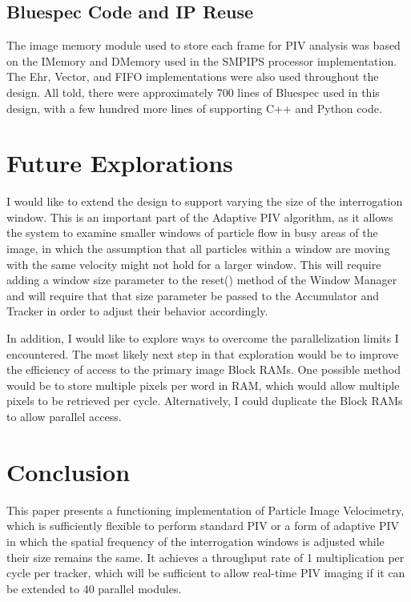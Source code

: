\documentclass{article}
\begin{document}
\subsection{Bluespec Code and IP Reuse}
The image memory module used to store each frame for PIV analysis was based on the IMemory and DMemory used in the SMPIPS processor implementation. The Ehr, Vector, and FIFO implementations were also used throughout the design. All told, there were approximately 700 lines of Bluespec used in this design, with a few hundred more lines of supporting C++ and Python code. 

\section{Future Explorations}
I would like to extend the design to support varying the size of the interrogation window. This is an important part of the Adaptive PIV algorithm, as it allows the system to examine smaller windows of particle flow in busy areas of the image, in which the assumption that all particles within a window are moving with the same velocity might not hold for a larger window. This will require adding a window size parameter to the reset() method of the Window Manager and will require that that size parameter be passed to the Accumulator and Tracker in order to adjust their behavior accordingly. 

In addition, I would like to explore ways to overcome the parallelization limits I encountered. The most likely next step in that exploration would be to improve the efficiency of access to the primary image Block RAMs. One possible method would be to store multiple pixels per word in RAM, which would allow multiple pixels to be retrieved per cycle. Alternatively, I could duplicate the Block RAMs to allow parallel access. 

\section{Conclusion}
This paper presents a functioning implementation of Particle Image Velocimetry, which is sufficiently flexible to perform standard PIV or a form of adaptive PIV in which the spatial frequency of the interrogation windows is adjusted while their size remains the same. It achieves a throughput rate of 1 multiplication per cycle per tracker, which will be sufficient to allow real-time PIV imaging if it can be extended to 40 parallel modules. 

	
	
\end{document}
